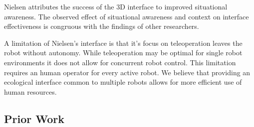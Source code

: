 Nielsen attributes the success of the 3D interface to improved situational awareness. The observed effect of situational awareness and context on interface effectiveness is congruous with the findings of other researchers. \cite{Nielsen_Teleoperation}

A limitation of Nielsen's interface is that it's focus on teleoperation leaves the robot without autonomy. While teleoperation may be optimal for single robot environments it does not allow for concurrent robot control. This limitation requires an human operator for every active robot. We believe that providing an ecological interface common to multiple robots allows for more efficient use of human resources.

\subsection{Prior Work} %
\label{sub:hri_prior_work}

